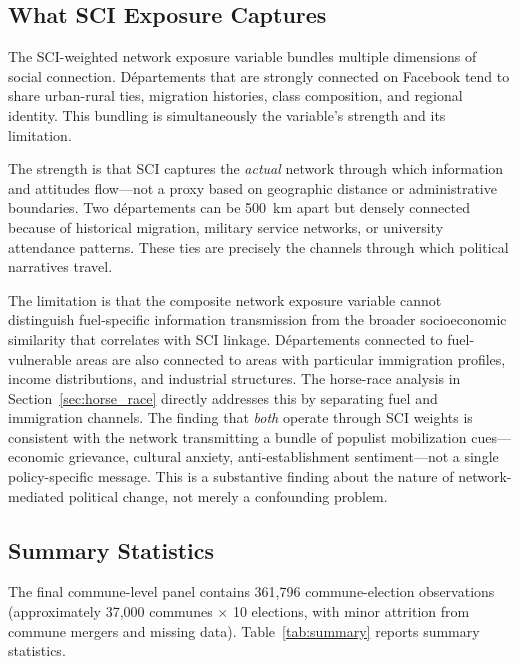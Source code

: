 \documentclass[12pt]{article}
\newcommand{\depts}{d\'{e}partements}
\begin{document}
\subsection{What SCI Exposure Captures}
\label{sec:sci_captures}

The SCI-weighted network exposure variable bundles multiple dimensions of social connection. D\'{e}partements that are strongly connected on Facebook tend to share urban-rural ties, migration histories, class composition, and regional identity. This bundling is simultaneously the variable's strength and its limitation.

The strength is that SCI captures the \emph{actual} network through which information and attitudes flow---not a proxy based on geographic distance or administrative boundaries. Two \depts{} can be 500~km apart but densely connected because of historical migration, military service networks, or university attendance patterns. These ties are precisely the channels through which political narratives travel.

The limitation is that the composite network exposure variable cannot distinguish fuel-specific information transmission from the broader socioeconomic similarity that correlates with SCI linkage. D\'{e}partements connected to fuel-vulnerable areas are also connected to areas with particular immigration profiles, income distributions, and industrial structures. The horse-race analysis in Section~\ref{sec:horse_race} directly addresses this by separating fuel and immigration channels. The finding that \emph{both} operate through SCI weights is consistent with the network transmitting a bundle of populist mobilization cues---economic grievance, cultural anxiety, anti-establishment sentiment---not a single policy-specific message. This is a substantive finding about the nature of network-mediated political change, not merely a confounding problem.

\subsection{Summary Statistics}

The final commune-level panel contains 361,796 commune-election observations (approximately 37,000 communes $\times$ 10 elections, with minor attrition from commune mergers and missing data). Table~\ref{tab:summary} reports summary statistics.
\end{document}
